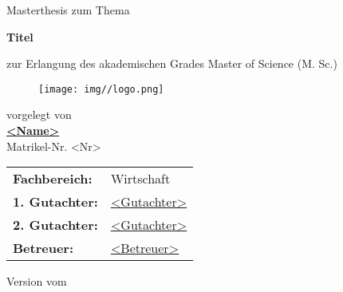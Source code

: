 \begin{titlepage}
  \begin{center}
    \begin{large}
        Masterthesis zum Thema
    \end{large}

    \vspace{0.75cm}

    \begin{huge}
      \begin{singlespace}
        \textbf{Titel}
      \end{singlespace}
    \end{huge}

    \vspace{0.8cm}

    \begin{large}
      zur Erlangung des akademischen Grades Master of Science (M. Sc.) \\
    \end{large}

    \vspace{1.75cm}

    \begin{figure}[H]
      \centering
      \texttt{[image: img//logo.png]}
      \label{img:fh-trier-logo}
    \end{figure}

    \vspace{1.25cm}

    \begin{Large}
      vorgelegt von \\
      \href{mailto:<email-adresse>}{\textbf{<Name>}} \\
      Matrikel-Nr. <Nr>
    \end{Large}

    \vspace{1.5cm}

    \begin{table}[H]
      \centering
      \begin{tabular}{ll}
        \textbf{Fachbereich:}   & Wirtschaft \\
        \textbf{1. Gutachter:}  & \href{mailto:<email-adresse>}{<Gutachter>}          \\
        \textbf{2. Gutachter:}  & \href{mailto:<email-adresse>}{<Gutachter>}   \\
        \textbf{Betreuer:}      & \href{mailto:<email-adresse>}{<Betreuer>}                  \\
      \end{tabular}
    \end{table}

    \vspace{1.5cm}

    Version  vom 

  \end{center}
\end{titlepage}
